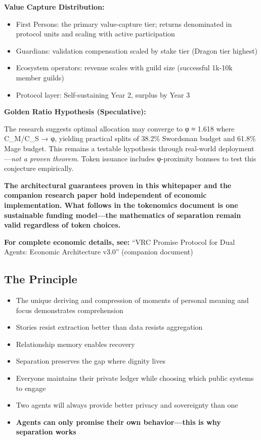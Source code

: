 \documentclass[
  11pt,
]{article}
\begin{document}
\textbf{Value Capture Distribution:}

\begin{itemize}
\item
  First Persons: the primary value-capture tier; returns denominated in
  protocol units and scaling with active participation
\item
  Guardians: validation compensation scaled by stake tier (Dragon tier
  highest)
\item
  Ecosystem operators: revenue scales with guild size (successful 1k-10k
  member guilds)
\item
  Protocol layer: Self-sustaining Year 2, surplus by Year 3
\end{itemize}

\textbf{Golden Ratio Hypothesis (Speculative):}

The research suggests optimal allocation may converge to φ ≈ 1.618 where
C\_M/C\_S → φ, yielding practical splits of 38.2\% Swordsman budget and
61.8\% Mage budget. This remains a testable hypothesis through
real-world deployment---\emph{not a proven theorem}. Token issuance
includes φ-proximity bonuses to test this conjecture empirically.

\textbf{The architectural guarantees proven in this whitepaper and the
companion research paper hold independent of economic implementation.
What follows in the tokenomics document is one sustainable funding
model---the mathematics of separation remain valid regardless of token
choices.}

\textbf{For complete economic details, see:} ``VRC Promise Protocol for
Dual Agents: Economic Architecture v3.0'' (companion document)

\subsection{The Principle}\label{the-principle}

\begin{itemize}
\item
  The unique deriving and compression of moments of personal meaning and
  focus demonstrates comprehension
\item
  Stories resist extraction better than data resists aggregation
\item
  Relationship memory enables recovery
\item
  Separation preserves the gap where dignity lives
\item
  Everyone maintains their private ledger while choosing which public
  systems to engage
\item
  Two agents will always provide better privacy and sovereignty than one
\item
  \textbf{Agents can only promise their own behavior---this is why
  separation works}
\end{itemize}
\end{document}

